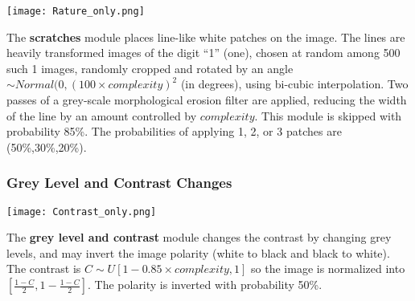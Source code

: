\documentclass[smallcondensed]{svjour3}     %
\begin{document}
\begin{minipage}[t]{0.14\textwidth}
\begin{center}
\vspace*{4mm}
\texttt{[image: Rature\_only.png]}\\
\end{center}
\end{minipage}%
\hspace{0.3cm}\begin{minipage}[t]{0.86\linewidth}
The {\bf scratches} module places line-like white patches on the image.  The
lines are heavily transformed images of the digit ``1'' (one), chosen
at random among 500 such 1 images,
randomly cropped and rotated by an angle $\sim Normal(0,(100 \times
complexity)^2$ (in degrees), using bi-cubic interpolation.
Two passes of a grey-scale morphological erosion filter
are applied, reducing the width of the line
by an amount controlled by $complexity$.
This module is skipped with probability 85\%. The probabilities
of applying 1, 2, or 3 patches are (50\%,30\%,20\%).
\end{minipage}


\subsubsection*{Grey Level and Contrast Changes}

\begin{minipage}[t]{0.15\linewidth}
\centering
\vspace*{0mm}
\texttt{[image: Contrast\_only.png]}
\end{minipage}%
\hspace{3mm}\begin{minipage}[t]{0.85\linewidth}
\vspace*{1mm}
The {\bf grey level and contrast} module changes the contrast by changing grey levels, and may invert the image polarity (white
to black and black to white). The contrast is $C \sim U[1-0.85 \times complexity,1]$ 
so the image is normalized into $[\frac{1-C}{2},1-\frac{1-C}{2}]$. The
polarity is inverted with probability 50\%.
\end{minipage}
\end{document}
